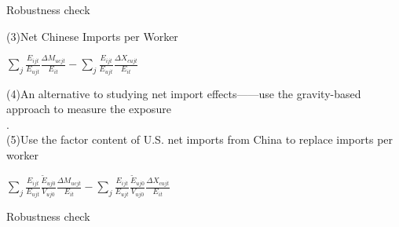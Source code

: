 \documentclass[10pt,aspectratio=43,mathserif,table]{beamer}
\begin{document}
\begin{frame}{Robustness check}


(3)Net Chinese Imports per Worker
\begin{center}		
	\LARGE $\sum_{j} \frac{E_{ijt}}{E_{ujt}} \frac{\Delta M_{ucjt} } {E_{it}} - \sum_{j} \frac{E_{ijt}}{E_{ujt}} \frac{\Delta X_{cujt} } {E_{it}} $
\end{center}
(4)An alternative to studying net import effects——use the gravity-based approach to measure the exposure\\  . \\
(5)Use the factor content of U.S. net imports from China to replace imports per worker
\begin{center}		
	\LARGE $\sum_{j} \frac{E_{ijt}}{E_{ujt}} \frac{\tilde{E}_{uj0}}{V_{uj0}} \frac{\Delta M_{ucjt} } {E_{it}} - \sum_{j} \frac{E_{ijt}}{E_{ujt}} \frac{\tilde{E}_{uj0}}{V_{uj0}} \frac{\Delta X_{cujt} } {E_{it}} $
\end{center}
\end{frame}






\begin{frame}{Robustness check}
	\begin{figure}[thpb]
		\centering
	\end{figure}
\end{frame}
\end{document}
